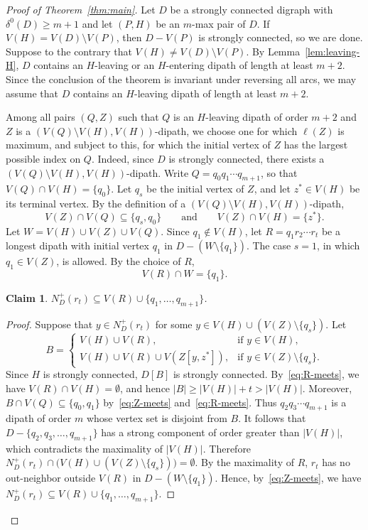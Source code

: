 \documentclass[12pt]{article}
\numberwithin{equation}{section}
\theoremstyle{plain}
\newtheorem{claim}[theorem]{Claim}
\theoremstyle{definition}
\begin{document}
\begin{proof}[Proof of Theorem~\ref{thm:main}]
Let $D$ be a strongly connected digraph with $\delta^0(D)\ge m+1$ and let $(P,H)$ be an $m$-max pair of $D$.
If $V(H)=V(D)\setminus V(P)$, then $D-V(P)$ is strongly connected, so we are done.
Suppose to the contrary that $V(H)\ne V(D)\setminus V(P)$.
By Lemma~\ref{lem:leaving-H}, $D$ contains an $H$-leaving or an $H$-entering dipath of length at least $m+2$.
Since the conclusion of the theorem is invariant under reversing all arcs, we may assume that $D$ contains an $H$-leaving dipath of length at least $m+2$.

Among all pairs $(Q,Z)$ such that $Q$ is an $H$-leaving dipath of order $m+2$ and $Z$ is a $(V(Q)\setminus V(H),V(H))$-dipath, we choose one for which $\ell(Z)$ is maximum, and subject to this, for which the initial vertex of $Z$ has the largest possible index on $Q$.
Indeed, since $D$ is strongly connected, there exists a $(V(Q)\setminus V(H),V(H))$-dipath.
Write $Q=q_0q_1\cdots q_{m+1}$, so that $V(Q)\cap V(H)=\{q_0\}$.
Let $q_s$ be the initial vertex of $Z$, and let $z^*\in V(H)$ be its terminal vertex.
By the definition of a $(V(Q)\setminus V(H),V(H))$-dipath,
\begin{equation}\label{eq:Z-meets}
V(Z)\cap V(Q)\subseteq\{q_s,q_0\}
\qquad\text{and}\qquad
V(Z)\cap V(H)=\{z^*\}.
\end{equation}
Let $W=V(H)\cup V(Z)\cup V(Q)$.
Since $q_1\notin V(H)$, let $R=q_1r_2\cdots r_t$ be a longest dipath with initial vertex $q_1$ in $D-(W\setminus\{q_1\})$.
The case $s=1$, in which $q_1\in V(Z)$, is allowed.
By the choice of $R$,
\begin{equation}\label{eq:R-meets}
V(R)\cap W=\{q_1\}.
\end{equation}

\begin{claim}\label{clm:containment}
$N_D^+(r_t)\subseteq V(R)\cup\{q_1,\ldots,q_{m+1}\}$.
\end{claim}

\begin{proof}
Suppose that $y\in N_D^+(r_t)$ for some $y\in V(H)\cup(V(Z)\setminus\{q_s\})$.
Let
\[
B=
\begin{cases}
V(H)\cup V(R),&\text{if }y\in V(H),\\
V(H)\cup V(R)\cup V(Z[y,z^*]),&\text{if }y\in V(Z)\setminus\{q_s\}.
\end{cases}
\]
Since $H$ is strongly connected, $D[B]$ is strongly connected.
By~\eqref{eq:R-meets}, we have $V(R)\cap V(H)=\emptyset$, and hence $|B|\ge|V(H)|+t>|V(H)|$.
Moreover, $B\cap V(Q)\subseteq\{q_0,q_1\}$ by~\eqref{eq:Z-meets} and~\eqref{eq:R-meets}.
Thus $q_2q_3\cdots q_{m+1}$ is a dipath of order $m$ whose vertex set is disjoint from $B$.
It follows that $D-\{q_2,q_3,\ldots,q_{m+1}\}$ has a strong component of order greater than $|V(H)|$, which contradicts the maximality of $|V(H)|$.
Therefore $N_D^+(r_t)\cap\bigl(V(H)\cup(V(Z)\setminus\{q_s\})\bigr)=\emptyset$.
By the maximality of $R$, $r_t$ has no out-neighbor outside $V(R)$ in $D-(W\setminus\{q_1\})$.
Hence, by~\eqref{eq:Z-meets}, we have $N_D^+(r_t)\subseteq V(R)\cup\{q_1,\ldots,q_{m+1}\}$.
\end{proof}


\end{proof}
\end{document}
